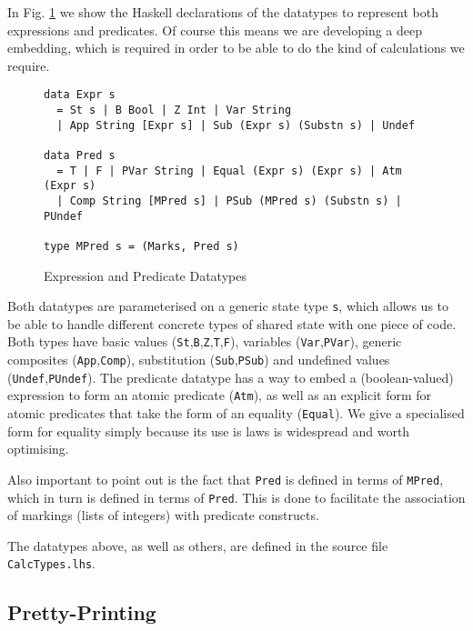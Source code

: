 In Fig. \ref{fig:expr-pred-types} we show the Haskell declarations
of the datatypes to represent both expressions and predicates.
Of course this means we are developing a deep embedding\cite{Gibbons:2014:FDS},
which is required in order to be able to do the kind of calculations we require.
\begin{figure}
\begin{verbatim}
data Expr s
  = St s | B Bool | Z Int | Var String
  | App String [Expr s] | Sub (Expr s) (Substn s) | Undef

data Pred s
  = T | F | PVar String | Equal (Expr s) (Expr s) | Atm (Expr s)
  | Comp String [MPred s] | PSub (MPred s) (Substn s) | PUndef

type MPred s = (Marks, Pred s)
\end{verbatim}
  \caption{Expression and Predicate Datatypes}
  \label{fig:expr-pred-types}
\end{figure}
Both datatypes are parameterised on a generic state type \texttt{s},
which allows us to be able to handle different concrete types
of shared state with one piece of code.
Both types have basic values (\texttt{St},\texttt{B},\texttt{Z},\texttt{T},\texttt{F}),
variables (\texttt{Var},\texttt{PVar}),
generic composites (\texttt{App},\texttt{Comp}),
substitution (\texttt{Sub},\texttt{PSub})
and undefined values (\texttt{Undef},\texttt{PUndef}).
The predicate datatype has a way to embed a (boolean-valued)
expression to form an atomic predicate (\texttt{Atm}),
as well as an explicit form for atomic predicates that take
the form of an equality (\texttt{Equal}).
We give a specialised form for equality simply because
its use is laws is widespread and worth optimising.

Also important to point out is the fact that \texttt{Pred} is
defined in terms of \texttt{MPred}, which in turn is defined
in terms of \texttt{Pred}.
This is done to facilitate the association of markings (lists of integers)
with predicate constructs.

The datatypes above, as well as others, are defined in the
source file \texttt{CalcTypes.lhs}.


\subsection{Pretty-Printing}\label{ssec:pp}


